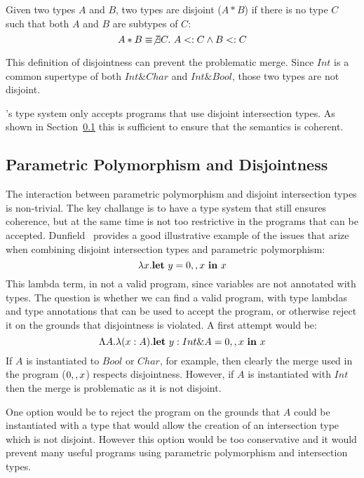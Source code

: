 Given two types $A$ and $B$, two types are disjoint
($A * B$) if there is no type $C$ such that both $A$ and $B$ are
subtypes of $C$:
\[A * B \equiv \not\exists C.~A <: C \wedge B <: C\]

\noindent This definition of disjointness can prevent the problematic
merge. Since $Int$ is a common supertype of both $Int \& Char$ and 
$Int \& Bool$, those two types are not disjoint. 

\name's type system only accepts programs that use disjoint
intersection types. As shown in Section~\ref{} this is sufficient to 
ensure that the semantics is coherent.  

\subsection{Parametric Polymorphism and Disjointness}
The interaction between parametric polymorphism and disjoint
intersection types is non-trivial. The key challange is to have a type
system that still ensures coherence, but at the same time is not too
restrictive in the programs that can be accepted. Dunfield~\cite{} provides a 
good illustrative example of the issues that arize when combining 
disjoint intersection types and parametric polymorphism:
\[\lambda x. {\bf let}~y = 0 ,, x~{\bf in}~x\]
This lambda term, in not a valid \name program, since variables are 
not annotated with types. The question is whether we can find 
a valid \name program, with type lambdas and type annotations that can 
be used to accept the program, or otherwise reject it on the grounds 
that disjointness is violated. A first attempt would be:
\[\Lambda A.\lambda (x:A). {\bf let}~y : Int \& A = 0 ,, x~{\bf in}~x\]
If $A$ is instantiated to $Bool$ or $Char$, for example, then clearly
the merge used in the program ($0 ,, x$) respects disjointness. However, if $A$
is instantiated with $Int$ then the merge is problematic as it is not
disjoint. 

One option would be to reject the program on the grounds
that $A$ could be instantiated with a type that would allow the
creation of an intersection type which is not disjoint. However this
option would be too conservative and it would prevent many useful
programs using parametric polymorphism and intersection types.

